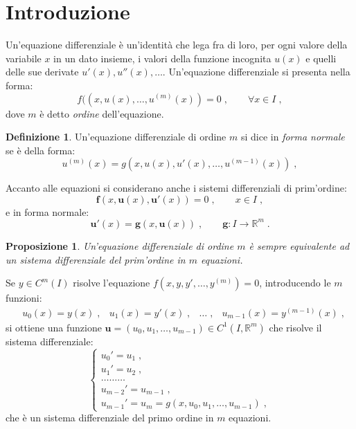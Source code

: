 \documentclass[a4paper,12pt]{report}
\theoremstyle{plain}
\newtheorem{prop}{Proposizione}[section]
\theoremstyle{definition}
\newtheorem{defn}{Definizione}[section]
\theoremstyle{remark}
\numberwithin{equation}{section}
\begin{document}
\section{Introduzione}
Un'equazione differenziale è un'identità che lega fra di loro, per ogni valore della variabile $x$ in un dato insieme, i valori della 
funzione incognita $u(x)$ e quelli delle sue derivate $u'(x),u''(x),\ldots$. Un'equazione differenziale si presenta nella forma:
\begin{equation}
f(\left(x,u(x),\ldots,u^{(m)}(x)\right)=0\;, \qquad \forall x\in I\;,
\end{equation}
dove $m$ è detto \textit{ordine} dell'equazione.
\begin{defn} Un'equazione differenziale di ordine $m$ si dice in \textit{forma normale} se è della forma:
\begin{equation}
u^{(m)}(x)=g(x,u(x),u'(x),\ldots,u^{(m-1)}(x))\;,
\end{equation}
\end{defn}
Accanto alle equazioni si considerano anche i sistemi differenziali di prim'ordine:
\begin{equation}
\mathbf{f}(x,\mathbf{u}(x),\mathbf{u}'(x))=0\;, \qquad x\in I\;,
\end{equation}
e in forma normale:
\begin{equation}
\mathbf{u}'(x)=\mathbf{g}(x,\mathbf{u}(x))\;, \qquad \mathbf{g}:I\to\mathbb{R}^m\;.
\end{equation}
\begin{prop} Un'equazione differenziale di ordine $m$ è sempre equivalente ad un sistema differenziale del prim'ordine in $m$ equazioni.
\end{prop}
\proof Se $y \in C^m(I)$ risolve l'equazione $f(x,y,y',\ldots,y^{(m)})=0$, introducendo le $m$ funzioni:
\begin{equation}
\begin{matrix}
&u_0(x)=y(x)\;, &u_1(x)=y'(x)\;, &\ldots\;, &u_{m-1}(x)=y^{(m-1)}(x)\;,
\end{matrix}
\end{equation}
si ottiene una funzione $\mathbf{u}=(u_0,u_1,\ldots,u_{m-1}) \in C^1(I, \mathbb{R}^m)$ che risolve il sistema differenziale:
\begin{equation}
\begin{cases}
 u_0'=u_1\;, \\
u_1'=u_2\;, \\
\ldots \ldots \ldots \\
u_{m-2}'=u_{m-1}\;, \\
u_{m-1}'=u_m=g(x,u_0,u_1,\ldots,u_{m-1})\;,
\end{cases}
\end{equation}
che è un sistema differenziale del primo ordine in $m$ equazioni.
\endproof
\end{document}

